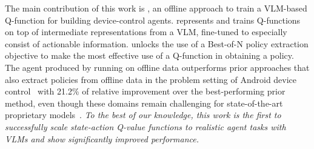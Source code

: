 The main contribution of this work is \ourmethod{}, an offline approach to train a VLM-based Q-function for building device-control agents. \ourmethod{} represents and trains Q-functions on top of intermediate representations from a VLM, fine-tuned to especially consist of actionable information. \ourmethod{} unlocks the use of a Best-of-N policy extraction objective to make the most effective use of a Q-function in obtaining a policy. The agent produced by running \ourmethod{} on offline data outperforms prior approaches that also extract policies from offline data in the problem setting of Android device control~\citep{rawles2023androidwildlargescaledataset} with 21.2\% of relative improvement over the best-performing prior method, even though these domains remain challenging for state-of-the-art proprietary models~\citep{liu2024visualagentbenchlargemultimodalmodels, bai2024digirltraininginthewilddevicecontrol}. 
\emph{To the best of our knowledge, this work is the first to successfully scale state-action Q-value functions to realistic agent tasks with VLMs and show significantly improved performance.}